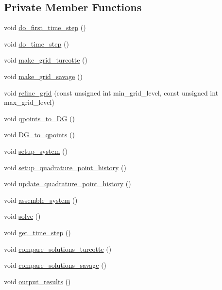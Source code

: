 \subsection*{Private Member Functions}
\begin{DoxyCompactItemize}
\item 
void \hyperlink{classvsf_1_1ApShear_a49ba2c773ca4f6a1946dee0d08e76901}{do\-\_\-first\-\_\-time\-\_\-step} ()
\item 
void \hyperlink{classvsf_1_1ApShear_a230bde382d9f71b56181ae943634611e}{do\-\_\-time\-\_\-step} ()
\item 
void \hyperlink{classvsf_1_1ApShear_ab12b87e8d50262d7735c5ba0aab1549f}{make\-\_\-grid\-\_\-turcotte} ()
\item 
void \hyperlink{classvsf_1_1ApShear_a265e55ba004056c96ab59aa633d5510f}{make\-\_\-grid\-\_\-savage} ()
\item 
void \hyperlink{classvsf_1_1ApShear_ae0c1413d01e98526e4a61a7324bf2ae0}{refine\-\_\-grid} (const unsigned int min\-\_\-grid\-\_\-level, const unsigned int max\-\_\-grid\-\_\-level)
\item 
void \hyperlink{classvsf_1_1ApShear_ad0d3a17afc6092f53560a50fd21c82f3}{qpoints\-\_\-to\-\_\-\-D\-G} ()
\item 
void \hyperlink{classvsf_1_1ApShear_accf1d57fc6f81758bf06a93ef70f74c4}{D\-G\-\_\-to\-\_\-qpoints} ()
\item 
void \hyperlink{classvsf_1_1ApShear_aa64a11292b5664242bb982a1a400fae0}{setup\-\_\-system} ()
\item 
void \hyperlink{classvsf_1_1ApShear_a7e74ebe08f8b6586a71c606a64ab4db4}{setup\-\_\-quadrature\-\_\-point\-\_\-history} ()
\item 
void \hyperlink{classvsf_1_1ApShear_a6b2acd54f930d5deac94064923e1aa7b}{update\-\_\-quadrature\-\_\-point\-\_\-history} ()
\item 
void \hyperlink{classvsf_1_1ApShear_a53c9284a86fc90a817ddad24eaf18569}{assemble\-\_\-system} ()
\item 
void \hyperlink{classvsf_1_1ApShear_a7e90fa26f6c78252f8e4592d5fc7adcf}{solve} ()
\item 
void \hyperlink{classvsf_1_1ApShear_ab58464c123140aaa9e231ddea2e94a03}{get\-\_\-time\-\_\-step} ()
\item 
void \hyperlink{classvsf_1_1ApShear_aa7a681d59cd2147f021245e7cccc0d32}{compare\-\_\-solutions\-\_\-turcotte} ()
\item 
void \hyperlink{classvsf_1_1ApShear_a2b1bb3ca132f62ccf3c2ca1e4e81f97c}{compare\-\_\-solutions\-\_\-savage} ()
\item 
void \hyperlink{classvsf_1_1ApShear_af10b1bbda00ef235b3bff742831890bf}{output\-\_\-results} ()
\end{DoxyCompactItemize}
